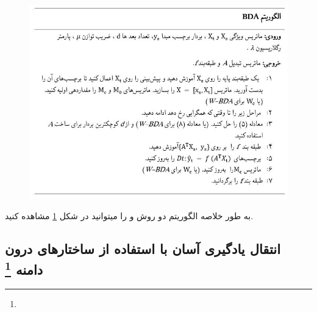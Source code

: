 {{{ 		\begin{figure}
 			\centering
 			\includegraphics[scale=0.5]{images/table1.jpg}
 			\caption{}
 			\label{fig:5}
 		\end{figure}
 	
 	به طور خلاصه الگوریتم دو روش 
 	و
 	را میتوانید در شکل
 	\ref{fig:5}
 	 مشاهده کنید.
 		
 	}
	}

	\subsection{
		انتقال یادگیری آسان با استفاده از ساختارهای درون دامنه
		\protect \footnote{}
	}

}
